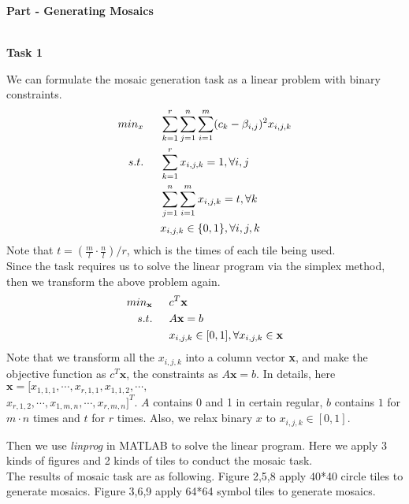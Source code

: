 \documentclass[12pt,a4paper]{article}
\begin{document}
\thispagestyle{empty}
\Large \textbf{Part \uppercase\expandafter{} - Generating Mosaics}

~\\
\normalsize \textbf{Task 1}\\ 
\par We can formulate the mosaic generation task as a linear problem with binary constraints.
\begin{equation*}
\begin{aligned}
min_{x}\indent& \sum_{k=1}^{r}\sum_{j=1}^{n}\sum_{i=1}^{m}(c_{k}-\beta_{i,j})^{2}x_{i,j,k}\\
s.t.\indent& \sum_{k=1}^{r}x_{i,j,k}=1, \forall i,j\\
& \sum_{j=1}^{n}\sum_{i=1}^{m}x_{i,j,k}=t, \forall k\\
&  x_{i,j,k} \in \{0,1\}, \forall i,j,k
\end{aligned}
\end{equation*}		
Note that $t=(\frac{m}{l}\cdot\frac{n}{l})/r$, which is the times of each tile being used.\\
\indent Since the task requires us to solve the linear program via the simplex method, then we transform the above problem again.
\begin{equation*}
\begin{aligned}
min_{\textbf{x}}\indent& c^{T}\textbf{x}\\
s.t.\indent& A\textbf{x}=b\\
& x_{i,j,k} \in [0,1], \forall x_{i,j,k}\in \textbf{x}\\
\end{aligned}
\end{equation*}	
Note that we transform all the $x_{i,j,k}$ into a column vector \textbf{x}, and make the objective function as $c^{T}\textbf{x}$, the constraints as $A\textbf{x}=b$. In details, here $\textbf{x} = [x_{1,1,1},\cdots,x_{r,1,1},x_{1,1,2},\cdots,$\\
$x_{r,1,2},\cdots,x_{1,m,n},\cdots,x_{r,m,n}]^{T}$. $A$ contains 0 and 1 in certain regular, $b$ contains $1$ for $m\cdot n$ times and $t$ for $r$ times. Also, we relax binary $x$ to $x_{i,j,k} \in [0,1]$.\\
\par Then we use \textit{linprog} in MATLAB to solve the linear program. Here we apply 3 kinds of figures and 2 kinds of tiles to conduct the mosaic task.\\
\indent The results of mosaic task are as following. Figure 2,5,8 apply 40*40 circle tiles to generate mosaics. Figure 3,6,9 apply 64*64 symbol tiles to generate mosaics.
\end{document}
